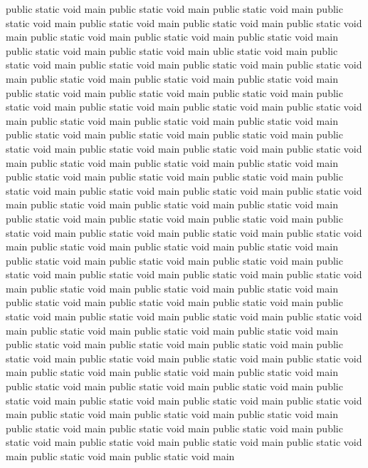 \documentclass[12pt]{article}
\begin{document}
public static void main
public static void main
public static void main
public static void main
public static void main
public static void main
public static void main
public static void main
public static void main
public static void main
public static void main
public static void main
ublic static void main
public static void main
public static void main
public static void main
public static void main
public static void main
public static void main
public static void main
public static void main
public static void main
public static void main
public static void main
public static void main
public static void main
public static void main
public static void main
public static void main
public static void main
public static void main
public static void main
public static void main
public static void main
public static void main
public static void main
public static void main
public static void main
public static void main
public static void main
public static void main
public static void main
public static void main
public static void main
public static void main
public static void main
public static void main
public static void main
public static void main
public static void main
public static void main
public static void main
public static void main
public static void main
public static void main
public static void main
public static void main
public static void main
public static void main
public static void main
public static void main
public static void main
public static void main
public static void main
public static void main
public static void main
public static void main
public static void main
public static void main
public static void main
public static void main
public static void main
public static void main
public static void main
public static void main
public static void main
public static void main
public static void main
public static void main
public static void main
public static void main
public static void main
public static void main
public static void main
public static void main
public static void main
public static void main
public static void main
public static void main
public static void main
public static void main
public static void main
public static void main
public static void main
public static void main
public static void main
public static void main
public static void main
public static void main
public static void main
public static void main
public static void main
public static void main
public static void main
public static void main
public static void main
public static void main
public static void main
public static void main
\end{document}
